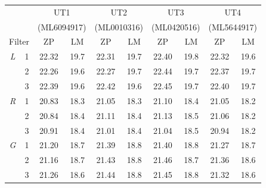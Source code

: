 \begin{colsection}
\begin{table}[p]
    \begin{center}
        \begin{tabular}{cc|cc|cc|cc|cc} %
             & &
            \multicolumn{2}{c|}{UT1} &
            \multicolumn{2}{c|}{UT2} &
            \multicolumn{2}{c|}{UT3} &
            \multicolumn{2}{c}{UT4}
            \\
             & &
            \multicolumn{2}{c|}{{\footnotesize(ML6094917)}} &
            \multicolumn{2}{c|}{{\footnotesize(ML0010316)}} &
            \multicolumn{2}{c|}{{\footnotesize(ML0420516)}} &
            \multicolumn{2}{c}{{\footnotesize(ML5644917)}}
            \\
            \multicolumn{2}{c|}{Filter} &
            ZP & LM & ZP & LM & ZP & LM & ZP & LM \\
            \midrule
            \textit{L} & 1 &
            22.32 & 19.7 &
            22.31 & 19.7 &
            22.40 & 19.8 &
            22.32 & 19.6
            \\
            & 2 &
            22.26 & 19.6 &
            22.27 & 19.7 &
            22.44 & 19.7 &
            22.37 & 19.7
            \\
            & 3 &
            22.39 & 19.6 &
            22.42 & 19.6 &
            22.45 & 19.7 &
            22.40 & 19.7
            \\
            \midrule
            \textit{R} & 1 &
            20.83 & 18.3 &
            21.05 & 18.3 &
            21.10 & 18.4 &
            21.05 & 18.2
            \\
            & 2 &
            20.84 & 18.4 &
            21.11 & 18.4 &
            21.13 & 18.5 &
            21.06 & 18.2
            \\
            & 3 &
            20.91 & 18.4 &
            21.01 & 18.4 &
            21.04 & 18.5 &
            20.94 & 18.2
            \\
            \midrule
            \textit{G} & 1 &
            21.20 & 18.7 &
            21.39 & 18.8 &
            21.40 & 18.8 &
            21.27 & 18.7
            \\
            & 2 &
            21.16 & 18.7 &
            21.43 & 18.8 &
            21.46 & 18.7 &
            21.36 & 18.6
            \\
            & 3 &
            21.26 & 18.6 &
            21.44 & 18.8 &
            21.45 & 18.8 &
            21.32 & 18.6
            \\
            \midrule

\end{tabular}
\end{center}
\end{table}
\end{colsection}

